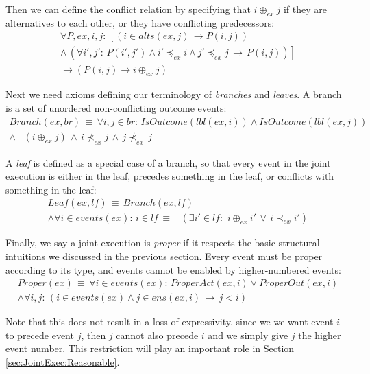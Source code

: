 Then we can define the conflict relation by specifying that $i\oplus_{ex}j$
if they are alternatives to each other, or they have conflicting predecessors:\begin{multline*}
\forall P,ex,i,j:\,\left[\left(i\in alts(ex,j)\,\rightarrow P(i,j)\right)\right.\\
\left.\wedge\,\left(\forall i',j':\, P(i',j')\wedge i'\preceq_{ex}i\wedge j'\preceq_{ex}j\,\rightarrow\, P(i,j)\right)\right]\\
\rightarrow\left(P(i,j)\rightarrow i\oplus_{ex}j\right)\end{multline*}


Next we need axioms defining our terminology of \emph{branches} and
\emph{leaves}. A branch is a set of unordered non-conflicting outcome
events:\begin{multline*}
Branch(ex,br)\,\equiv\,\forall i,j\in br:\, IsOutcome(lbl(ex,i))\wedge IsOutcome(lbl(ex,j))\\
\wedge\,\neg(i\oplus_{ex}j)\,\wedge\, i\not\prec_{ex}j\,\wedge\, j\not\prec_{ex}\, j\end{multline*}


A \emph{leaf} is defined as a special case of a branch, so that every
event in the joint execution is either in the leaf, precedes something
in the leaf, or conflicts with something in the leaf:\begin{multline*}
Leaf(ex,lf)\,\equiv\, Branch(ex,lf)\\
\wedge\forall i\in events(ex):\, i\in lf\,\equiv\,\neg(\exists i'\in lf:\,\, i\oplus_{ex}i'\,\vee\, i\prec_{ex}i')\end{multline*}


Finally, we say a joint execution is \emph{proper} if it respects
the basic structural intuitions we discussed in the previous section.
Every event must be proper according to its type, and events cannot
be enabled by higher-numbered events:\begin{gather*}
Proper(ex)\,\equiv\,\forall i\in events(ex):\, ProperAct(ex,i)\vee ProperOut(ex,i)\\
\wedge\forall i,j:\,\left(i\in events(ex)\wedge j\in ens(ex,i)\,\rightarrow\, j<i\right)\end{gather*}


Note that this does not result in a loss of expressivity, since we
we want event $i$ to precede event $j$, then $j$ cannot also precede
$i$ and we simply give $j$ the higher event number. This restriction
will play an important role in Section \ref{sec:JointExec:Reasonable}.

